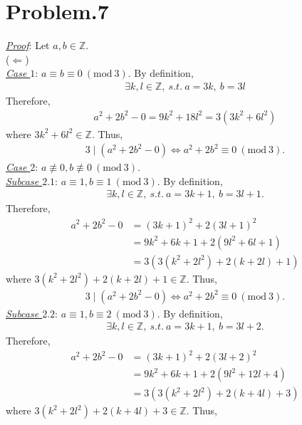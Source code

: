 \documentclass[12pt]{article}
\begin{document}
\section*{Problem.7}
\underline{\textit{Proof}}: Let $a,b \in \mathbb{Z}$.\\[1em]
($\Leftarrow$)\\[1em]
\underline{\textit{Case $1$}}: $a \equiv b \equiv 0~(\mathrm{mod}~3)$.
By definition,
\begin{gather*}
\exists k, l \in \mathbb{Z},~s.t.~ a = 3k,~b = 3l
\end{gather*}
Therefore,
\begin{gather*}
a^2 + 2 b^2 - 0 = 9 k^2 + 18 l^2 = 3(3 k^2 + 6 l^2)
\end{gather*}
where $3 k^2 + 6 l^2 \in \mathbb{Z}$. Thus,
\begin{gather*}
3 \mid (a^2 + 2 b^2 - 0) \Leftrightarrow a^2 + 2 b^2 \equiv 0~(\mathrm{mod}~3).
\end{gather*}
\underline{\textit{Case $2$}}: $a \not \equiv 0, b \not \equiv 0 ~(\mathrm{mod}~3)$.\\[1em]
\underline{\textit{Subcase $2.1$}}: $a \equiv 1, b \equiv 1 ~(\mathrm{mod}~3)$.
By definition,
\begin{gather*}
\exists k, l \in \mathbb{Z},~s.t.~ a = 3k + 1,~b = 3l + 1.
\end{gather*}
Therefore,
\begin{align*}
a^2 + 2 b^2 - 0 &= (3k + 1)^2 + 2 (3l + 1)^2\\[1em]
&= 9k^2 + 6k + 1 + 2(9l^2 + 6l +1)\\[1em]
&= 3(3(k^2+2l^2) + 2(k+ 2l) + 1)
\end{align*}
where $3(k^2+2l^2) + 2(k+ 2l) + 1 \in \mathbb{Z}$. Thus,
\begin{gather*}
3 \mid (a^2 + 2 b^2 - 0) \Leftrightarrow a^2 + 2 b^2 \equiv 0~(\mathrm{mod}~3).
\end{gather*}
\underline{\textit{Subcase $2.2$}}: $a \equiv 1, b \equiv 2 ~(\mathrm{mod}~3)$.
By definition,
\begin{gather*}
\exists k, l \in \mathbb{Z},~s.t.~ a = 3k + 1,~b = 3l + 2.
\end{gather*}
Therefore,
\begin{align*}
a^2 + 2 b^2 - 0 &= (3k + 1)^2 + 2 (3l + 2)^2\\[1em]
&= 9k^2 + 6k + 1 + 2(9l^2 + 12l + 4)\\[1em]
&= 3(3(k^2+2l^2) + 2(k+ 4l) + 3)
\end{align*}
where $3(k^2+2l^2) + 2(k+ 4l) + 3 \in \mathbb{Z}$. Thus,
\end{document}
